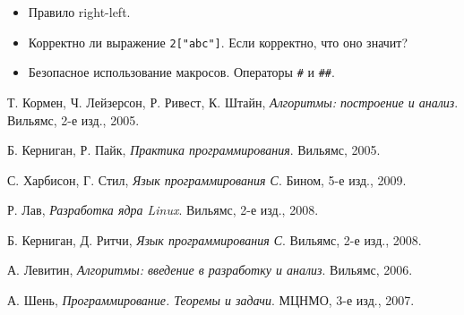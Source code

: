 \begin{itemize}
  \item Правило right-left.
  \item Корректно ли выражение \lstinline{2["abc"]}. Если корректно, что оно значит?
  \item Безопасное использование макросов. Операторы \lstinline{#} и \lstinline{##}.
\end{itemize}

\begin{thebibliography}{9}

  Т. Кормен, Ч. Лейзерсон, Р. Ривест, К. Штайн,
  \emph{Алгоритмы: построение и анализ}.
  Вильямс,
  2-е изд.,
  2005.

  Б. Керниган, Р. Пайк,
  \emph{Практика программирования}.
  Вильямс,
  2005.

  С. Харбисон, Г. Стил,
  \emph{Язык программирования С}.
  Бином,
  5-е изд.,
  2009.

  Р. Лав,
  \emph{Разработка ядра Linux}.
  Вильямс,
  2-е изд.,
  2008.

  Б. Керниган, Д. Ритчи,
  \emph{Язык программирования С}.
  Вильямс,
  2-е изд.,
  2008.

  А. Левитин,
  \emph{Алгоритмы: введение в разработку и анализ}.
  Вильямс,
  2006.

  А. Шень,
  \emph{Программирование. Теоремы и задачи}.
  МЦНМО,
  3-е изд.,
  2007.

\end{thebibliography}
